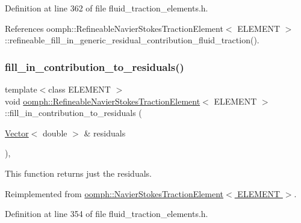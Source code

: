 Definition at line 362 of file fluid\+\_\+traction\+\_\+elements.\+h.



References oomph\+::\+Refineable\+Navier\+Stokes\+Traction\+Element$<$ E\+L\+E\+M\+E\+N\+T $>$\+::refineable\+\_\+fill\+\_\+in\+\_\+generic\+\_\+residual\+\_\+contribution\+\_\+fluid\+\_\+traction().

\mbox{\label{classoomph_1_1RefineableNavierStokesTractionElement_a994d2a7986cd7802f9062de227bf9481}} 
\subsubsection{\texorpdfstring{fill\+\_\+in\+\_\+contribution\+\_\+to\+\_\+residuals()}{fill\_in\_contribution\_to\_residuals()}}
{\footnotesize\ttfamily template$<$class E\+L\+E\+M\+E\+NT $>$ \\
void \hyperlink{classoomph_1_1RefineableNavierStokesTractionElement}{oomph\+::\+Refineable\+Navier\+Stokes\+Traction\+Element}$<$ E\+L\+E\+M\+E\+NT $>$\+::fill\+\_\+in\+\_\+contribution\+\_\+to\+\_\+residuals (\begin{DoxyParamCaption}\item[{\hyperlink{classoomph_1_1Vector}{Vector}$<$ double $>$ \&}]{residuals }\end{DoxyParamCaption})\hspace{0.3cm}{\ttfamily [inline]}, {\ttfamily [virtual]}}



This function returns just the residuals. 



Reimplemented from \hyperlink{classoomph_1_1NavierStokesTractionElement_a049940e46f7aba913cf05f95c31061f3}{oomph\+::\+Navier\+Stokes\+Traction\+Element$<$ E\+L\+E\+M\+E\+N\+T $>$}.



Definition at line 354 of file fluid\+\_\+traction\+\_\+elements.\+h.




